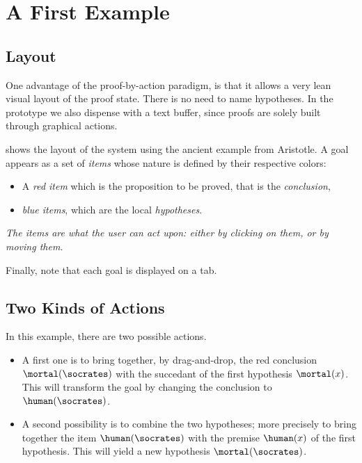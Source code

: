 
\section{A First Example}

\subsection{Layout}
One advantage of the proof-by-action paradigm, is that it allows a very lean
visual layout of the proof state. There is no need to name hypotheses. In the
prototype we also dispense with a text buffer, since proofs are solely built
through graphical actions.


 shows the layout of the system using the
ancient example from Aristotle. A goal appears as a set of {\em items}
whose nature is defined by their respective colors:
\begin{itemize}
\item A {\em red item} which is the proposition to be proved, that is the
 {\em conclusion},
\item {\em blue items}, which are the local {\em hypotheses}.
\end{itemize}

{\em The items are what the user can act upon: either by {\em clicking} on
them, or by {\em moving} them.}

Finally, note that each goal is displayed on a tab.

\subsection{Two Kinds of Actions}
In this example, there are two possible actions.

\begin{itemize}
\item A first one is to bring together, by drag-and-drop, the red conclusion
$\mortal(\socrates)$ with the succedant of the first hypothesis $\mortal(x)$.
This will transform the goal by changing the conclusion to $\human(\socrates)$.
\item A second possibility is to combine the two hypotheses; more precisely to
bring together the item $\human(\socrates)$ with the premise $\human(x)$ of the
first hypothesis. This will yield a new hypothesis $\mortal(\socrates)$.
\end{itemize}

